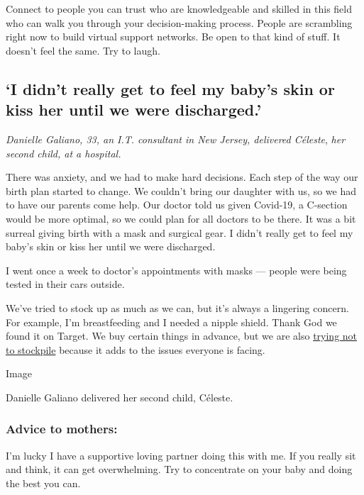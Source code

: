 Connect to people you can trust who are knowledgeable and skilled in
this field who can walk you through your decision-making process. People
are scrambling right now to build virtual support networks. Be open to
that kind of stuff. It doesn't feel the same. Try to laugh.

\hypertarget{i-didnt-really-get-to-feel-my-babys-skin-or-kiss-her-until-we-were-discharged}{%
\subsection{`I didn't really get to feel my baby's skin or kiss her
until we were
discharged.'}\label{i-didnt-really-get-to-feel-my-babys-skin-or-kiss-her-until-we-were-discharged}}

\emph{Danielle Galiano, 33, an I.T. consultant in New Jersey, delivered
Céleste}, \emph{her second child, at a hospital.}

There was anxiety, and we had to make hard decisions. Each step of the
way our birth plan started to change. We couldn't bring our daughter
with us, so we had to have our parents come help. Our doctor told us
given Covid-19, a C-section would be more optimal, so we could plan for
all doctors to be there. It was a bit surreal giving birth with a mask
and surgical gear. I didn't really get to feel my baby's skin or kiss
her until we were discharged.

I went once a week to doctor's appointments with masks --- people were
being tested in their cars outside.

We've tried to stock up as much as we can, but it's always a lingering
concern. For example, I'm breastfeeding and I needed a nipple shield.
Thank God we found it on Target. We buy certain things in advance, but
we are also
\href{https://www.nytimes.com/2020/03/30/parenting/coronavirus-baby-formula-shortages-wipes-diapers.html}{trying
not to stockpile} because it adds to the issues everyone is facing.

Image

Danielle Galiano delivered her second child, Céleste.

\hypertarget{advice-to-mothers-2}{%
\subsubsection{\texorpdfstring{\textbf{Advice to
mothers:}}{Advice to mothers:}}\label{advice-to-mothers-2}}

I'm lucky I have a supportive loving partner doing this with me. If you
really sit and think, it can get overwhelming. Try to concentrate on
your baby and doing the best you can.

